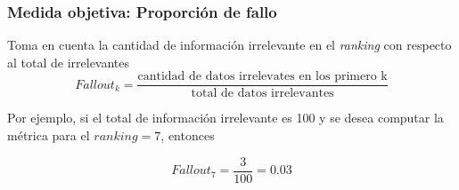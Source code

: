 \documentclass[
10pt, %
aspectratio=169, %
]{beamer}
\begin{document}
\begin{frame}
\begin{minipage}{.6\textwidth}
		\end{minipage}%
		
	\end{frame}
	
	\begin{frame}
		
		\frametitle{Medida objetiva: Proporción de fallo}
		
		\begin{minipage}{.5\textwidth}
			
			Toma en cuenta la cantidad de información irrelevante en el \emph{ranking} con respecto al total de irrelevantes
			$$Fallout_k = \frac{\text{cantidad de datos irrelevates en los primero k}}{\text{total de datos irrelevantes}}$$
			
			\vspace{3\baselineskip}
			
			Por ejemplo, si el total de información irrelevante es 100 y se desea computar la métrica para el $ranking = 7$, entonces
			
			$$Fallout_7 = \frac{3}{100} = 0.03$$
			
		\end{minipage}%
		\begin{minipage}{.6\textwidth}
			
			\begin{table}[ht]
				

\end{table}
\end{minipage}
\end{frame}
\end{document}
